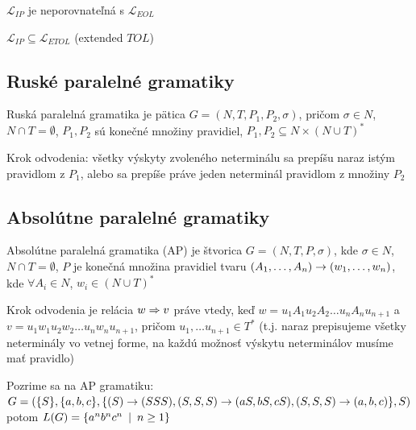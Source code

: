 \begin{veta}
    $\mathcal{L}_{IP}$ je neporovnateľná s $\mathcal{L}_{EOL}$
\end{veta}

\begin{veta}
    $\mathcal{L}_{IP}\subseteq\mathcal{L}_{ETOL}$ (extended $TOL$)
\end{veta}

\subsection{Ruské paralelné gramatiky}

\begin{definicia}
    Ruská paralelná gramatika je pätica $G=(N,T,P_{1},P_{2},\sigma)$,
    pričom $\sigma\in N$, \mbox{$N\cap T=\emptyset$}, $P_{1}, P_{2}$
    sú konečné množiny pravidiel, $P_{1},P_{2}\subseteq N\times(N\cup
    T)^{*}$
\end{definicia}

\begin{definicia}
    Krok odvodenia: všetky výskyty zvoleného neterminálu sa prepíšu
    naraz istým pravidlom z $P_{1}$, alebo sa prepíše práve jeden
    neterminál pravidlom z množiny $P_{2}$
\end{definicia}

\subsection{Absolútne paralelné gramatiky}

\begin{definicia}
    Absolútne paralelná gramatika (AP) je štvorica $G=(N,T,P,\sigma)$,
    kde \mbox{$\sigma\in N$}, $N\cap T=\emptyset$, $P$ je konečná
    množina pravidiel tvaru
    $(A_{1},\dots,A_{n})\rightarrow(w_{1},\dots,w_{n})$, kde \mbox{$\forall
    A_{i}\in N$}, $w_{i}\in(N\cup T)^{*}$
\end{definicia}

\begin{definicia}
    Krok odvodenia je relácia $w\Rightarrow v$ práve vtedy, keď
    $w=u_{1}A_{1}u_{2}A_{2}\dots u_{n}A_{n}u_{n+1}$ \mbox{a
    $v=u_{1}w_{1}u_{2}w_{2}\dots u_{n}w_{n}u_{n+1}$}, pričom
    $u_{1},\dots u_{n+1}\in T^{*}$ (t.j. naraz prepisujeme všetky
    neterminály vo vetnej forme, na každú možnosť výskytu neterminálov
    musíme mať pravidlo)
\end{definicia}

\begin{priklad}
    Pozrime sa na AP gramatiku:\\
    $G=(\{S\},\{a,b,c\},\{(S)\rightarrow(SSS),(S,S,S)\rightarrow (aS,bS,cS),(S,S,S)\rightarrow
    (a,b,c)\},S)$ potom $L(G)=\{a^{n}b^{n}c^{n}\enspace |\enspace n\geq1\}$
\end{priklad}


